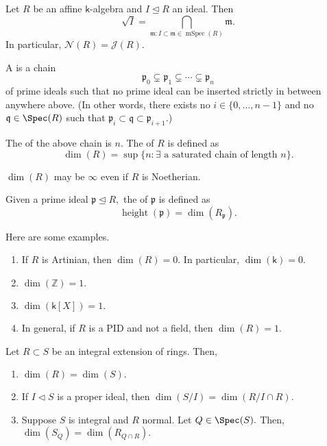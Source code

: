\documentclass[12pt]{article}	%
\DeclareMathOperator{\mSpec}{mSpec}
\DeclareMathOperator{\htt}{height}
\begin{document}
\begin{cor}
	Let $R$ be an affine $\mathsf{k}$-algebra and $I \unlhd R$ an ideal. Then
	\begin{equation*} 
		\sqrt{I} = \bigcap_{\mathfrak{m} : I \subset \mathfrak{m} \in \mSpec(R)} \mathfrak{m}.
	\end{equation*}
	In particular, $\mathcal{N}(R) = \mathcal{J}(R).$
\end{cor}

\begin{defn}%
	A  is a chain
	\begin{equation*} 
		\mathfrak{p}_0 \subsetneq \mathfrak{p}_1 \subsetneq \cdots \subsetneq \mathfrak{p}_n
	\end{equation*}
	of prime ideals such that no prime ideal can be inserted strictly in between anywhere above. (In other words, there exists no $i \in \{0, \ldots, n - 1\}$ and no $\mathfrak{q} \in \Spec(R)$ such that $\mathfrak{p}_i \subset \mathfrak{q} \subset \mathfrak{p}_{i + 1}.$)

	The  of the above chain is $n.$ The  of $R$ is defined as
	\begin{equation*} 
		\dim(R) = \sup\{n : \exists \text{ a saturated chain of length }n\}.
	\end{equation*}
\end{defn}
$\dim(R)$ may be $\infty$ even if $R$ is Noetherian. 
\begin{defn}%
	Given a prime ideal $\mathfrak{p} \unlhd R,$ the  of $\mathfrak{p}$ is defined as 
	\begin{equation*} 
		\htt(\mathfrak{p}) = \dim(R_\mathfrak{p}).
	\end{equation*}
\end{defn}

\begin{ex}
	Here are some examples.
	\begin{enumerate}
		\item If $R$ is Artinian, then $\dim(R) = 0.$ In particular, $\dim(\mathsf{k}) = 0.$
		\item $\dim(\mathbb{Z}) = 1.$
		\item $\dim(\mathsf{k}[X]) = 1.$
		\item In general, if $R$ is a PID and not a field, then $\dim(R) = 1.$
	\end{enumerate}
\end{ex}

\begin{prop}
	Let $R \subset S$ be an integral extension of rings. Then,
	\begin{enumerate}
		\item $\dim(R) = \dim(S).$
		\item If $I \lhd S$ is a proper ideal, then $\dim(S/I) = \dim(R/I \cap R).$
		\item Suppose $S$ is integral and $R$ normal. Let $Q \in \Spec(S).$ Then, $\dim(S_Q) = \dim(R_{Q \cap R}).$
	\end{enumerate}
\end{prop}
\end{document}
